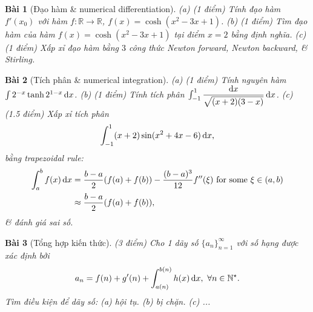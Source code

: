 \documentclass[12pt]{article}
\newtheorem{baitoan}{Bài}
\begin{document}
\begin{baitoan}[Đạo hàm \& numerical differentiation]
	(a) {\rm(1 điểm)} Tính đạo hàm $f'(x_0)$ với hàm $f:\mathbb{R}\to\mathbb{R}$, $f(x) = \cosh(x^2 - 3x + 1)$. (b) {\rm(1 điểm)}  Tìm đạo hàm của hàm $f(x) = \cosh(x^2 - 3x + 1)$ tại điểm $x = 2$ bằng định nghĩa. (c) {\rm(1 điểm)} Xấp xỉ đạo hàm bằng $3$ công thức Newton forward, Newton backward, \& Stirling.
\end{baitoan}

\begin{baitoan}[Tích phân \& numerical integration]
	(a) {\rm(1 điểm)} Tính nguyên hàm $\int  2^{-x}\tanh2^{1 - x}\,{\rm d}x$. (b) {\rm(1 điểm)} Tính tích phân $\int_{-1}^1 \dfrac{{\rm d}x}{\sqrt{(x + 2)(3 - x)}}\,{\rm d}x$. (c) {\rm(1.5 điểm)} Xấp xỉ tích phân
    \begin{equation*}
        \int_{-1}^1 (x + 2)\sin(x^2 + 4x - 6)\,{\rm d}x,
    \end{equation*}
    bằng trapezoidal rule:
    \begin{align*}
        \int_a^b f(x)\,{\rm d}x &= \frac{b - a}{2}(f(a) + f(b)) - \frac{(b - a)^3}{12}f''(\xi)\mbox{ for some }\xi\in(a,b)\\
        &\approx\frac{b - a}{2}(f(a) + f(b)),
    \end{align*}
    \& đánh giá sai số.
\end{baitoan}

\begin{baitoan}[Tổng hợp kiến thức]
    {\rm(3 điểm)} Cho 1 dãy số $\{a_n\}_{n=1}^\infty$ với số hạng được xác định bởi
    \begin{equation*}
        a_n = f(n) + g'(n) + \int_{a(n)}^{b(n)} h(x)\,{\rm d}x,\ \forall n\in\mathbb{N}^\star.
    \end{equation*}
    Tìm điều kiện để dãy số: (a) hội tụ. (b) bị chặn. (c) ...
\end{baitoan}


\printbibliography[heading=bibintoc]
\end{document}
